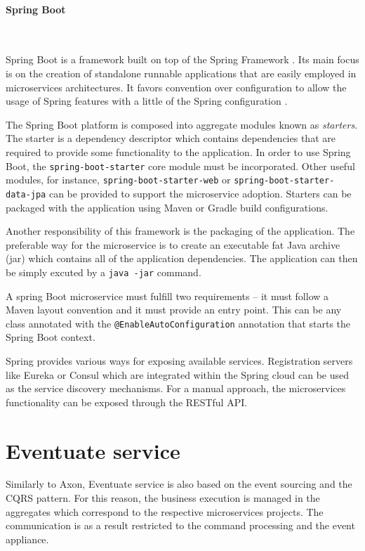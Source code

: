 \documentclass[oneside,
  digital, %
  table,   %
  nolof,     %
  nolot,     %
]{fithesis3}
\newcommand{\newlinepar}[1]{\paragraph{#1}\needspace{4\baselineskip}\mbox{}\\}
\begin{document}
\newlinepar{Spring Boot}
\label{sec:spring-boot}

Spring Boot is a framework built on top of the Spring Framework \cite{spring_ms}. Its main focus is on the creation of standalone runnable applications that are easily employed in microservices architectures. It favors convention over configuration to allow the usage of Spring features with a little of the Spring configuration \cite{spring_boot}.

The Spring Boot platform is composed into aggregate modules known as \textit{starters}. The starter is a dependency descriptor which contains dependencies that are required to provide some functionality to the application. In order to use Spring Boot, the \texttt{spring-boot-starter} core module must be incorporated. Other useful modules, for instance, \texttt{spring-boot-starter-web} or \texttt{spring-boot-starter-data-jpa} can be provided to support the microservice adoption. Starters can be packaged with the application using Maven or Gradle build configurations.

Another responsibility of this framework is the packaging of the application. The preferable way for the microservice is to create an executable fat Java archive (jar) which contains all of the application dependencies. The application can then be simply excuted by a \texttt{java -jar} command.

A spring Boot microservice must fulfill two requirements -- it must follow a Maven layout convention and it must provide an entry point. This can be any class annotated with the \texttt{@EnableAutoConfiguration} annotation that starts the Spring Boot context.

Spring provides various ways for exposing available services. Registration servers like Eureka or Consul which are integrated within the Spring cloud \cite{spring_cloud} can be used as the service discovery mechanisms. For a manual approach, the microservices functionality can be exposed through the RESTful API.



\section{Eventuate service}

Similarly to Axon, Eventuate service is also based on the event sourcing and the CQRS pattern. For this reason, the business execution is managed in the aggregates which correspond to the respective microservices projects. The communication is as a result restricted to the command processing and the event appliance.
\end{document}

